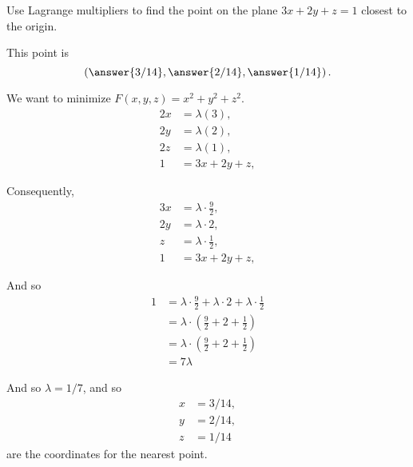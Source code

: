\documentclass{ximera}
\author{Jim Fowler}
\begin{document}
\begin{exercise}
Use Lagrange multipliers to find the point on the plane $3x + 2y + z = 1$ closest to the origin.

This point is
\[
  \left( \answer{3/14}, \answer{2/14}, \answer{1/14} \right).
\]
  
\begin{hint}
  We want to minimize $F(x,y,z) = x^2 + y^2 + z^2$.
\begin{align*}
  2x &= \lambda( 3 ), \\
  2y &= \lambda( 2 ), \\
  2z &= \lambda( 1 ), \\
  1 &= 3x + 2y + z,
\end{align*}
\end{hint}

\begin{hint}
Consequently,
\begin{align*}
  3x &= \lambda \cdot \frac{9}{2}, \\
  2y &= \lambda \cdot 2, \\
  z &= \lambda \cdot \frac{1}{2}, \\
  1 &= 3x + 2y + z,
\end{align*}
\end{hint}
\begin{hint}
And so
\begin{align*}
1
&= \lambda \cdot \frac{9}{2} + \lambda \cdot 2 + \lambda \cdot \frac{1}{2} \\
&= \lambda \cdot \left( \frac{9}{2} + 2 + \frac{1}{2} \right) \\
&= \lambda \cdot \left( \frac{9}{2} + 2 + \frac{1}{2} \right) \\
&= 7 \lambda
\end{align*}
\end{hint}
\begin{hint}
And so $\lambda = 1/7$, and so
\begin{align*}
  x &= 3/14, \\
  y &= 2/14, \\
  z &= 1/14
\end{align*}
are the coordinates for the nearest point.
\end{hint}

\end{exercise}
\end{document}
